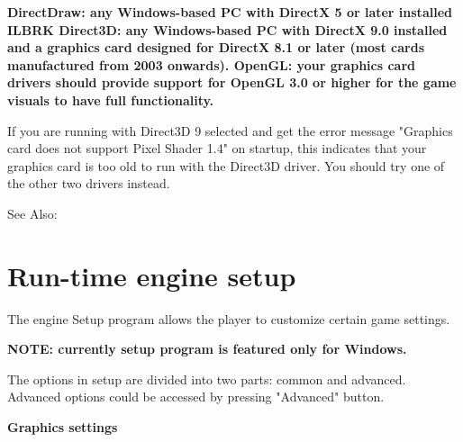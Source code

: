\bf{DirectDraw}: any Windows-based PC with DirectX 5 or later installed ILBRK
\bf{Direct3D}: any Windows-based PC with DirectX 9.0 installed and a graphics card designed
for DirectX 8.1 or later (most cards manufactured from 2003 onwards).
\bf{OpenGL}: your graphics card drivers should provide support for OpenGL 3.0 or higher for the game visuals to have full functionality.

If you are running with Direct3D 9 selected and get the error message "Graphics card does not support Pixel Shader 1.4" on startup,
this indicates that your graphics card is too old to run with the Direct3D driver. You should try one of the other two drivers instead.

See Also: 


\section{Run-time engine setup}\label{Setup}%

The engine Setup program allows the player to customize certain game settings.

\bf{NOTE:} currently setup program is featured only for Windows.

The options in setup are divided into two parts: common and advanced. Advanced
options could be accessed by pressing "Advanced" button.

\bf{Graphics settings}

